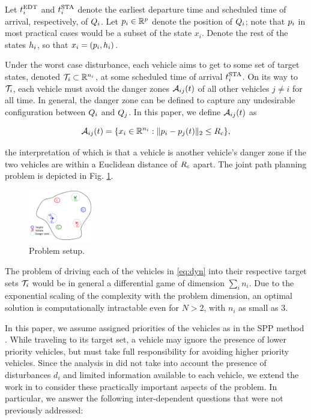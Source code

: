 Let $t^\text{EDT}_i$ and $t^\text{STA}_i$ denote the earliest departure time and scheduled time of arrival, respectively, of $Q_i$. Let $p_i \in \mathbb{R}^p$ denote the position of $Q_i$; note that $p_i$ in most practical cases would be a subset of the state $x_i$. Denote the rest of the states $h_i$, so that $x_i = (p_i, h_i)$. 

Under the worst case disturbance, each vehicle aims to get to some set of target states, denoted $\mathcal{T}_i \subset \mathbb{R}^{n_i}$, at some scheduled time of arrival $t^\text{STA}_i$. On its way to $\mathcal{T}_i$, each vehicle must avoid the danger zones $\mathcal{A}_{ij}(t)$ of all other vehicles $j\neq i$ for all time. In general, the danger zone can be defined to capture any undesirable configuration between $Q_i$ and $Q_j$. In this paper, we define $\mathcal{A}_{ij}(t)$ as

\vspace{-0.5em} 
\begin{equation}
\mathcal{A}_{ij}(t) = \{x_i \in \mathbb{R}^{n_i}: \|p_i - p_j(t)\|_2 \le R_c \},
\end{equation}

\noindent the interpretation of which is that a vehicle is another vehicle's danger zone if the two vehicles are within a Euclidean distance of $R_c$ apart. The joint path planning problem is depicted in Fig. \ref{fig:form}.

\begin{figure}[h]
  \centering
  \includegraphics[width=0.25\textwidth]{"fig/formulation"}
  \caption{Problem setup.}
  \label{fig:form}
  \vspace{-1.5em}
\end{figure}
 
The problem of driving each of the vehicles in \eqref{eq:dyn} into their respective target sets $\mathcal{T}_i$ would be in general a differential game of dimension $\sum_i n_i$. Due to the exponential scaling of the complexity with the problem dimension, an optimal solution is computationally intractable even for $N>2$, with $n_i$ as small as $3$.

In this paper, we assume assigned priorities of the vehicles as in the SPP method \cite{Chen15}. While traveling to its target set, a vehicle may ignore the presence of lower priority vehicles, but must take full responsibility for avoiding higher priority vehicles. Since the analysis in \cite{Chen15} did not take into account the presence of disturbances $d_i$ and limited information available to each vehicle, we extend the work in \cite{Chen15} to consider these practically important aspects of the problem. In particular, we answer the following inter-dependent questions that were not previously addressed:

